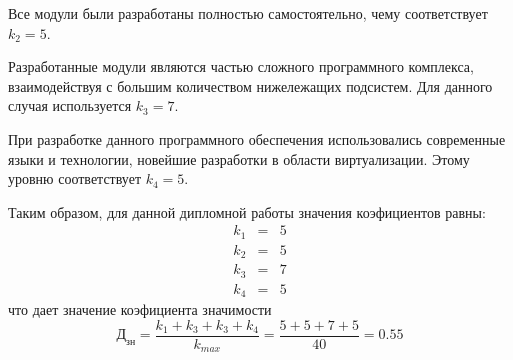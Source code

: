 Все модули были разработаны полностью самостоятельно, чему соответствует $k_2 = 5$.

Разработанные модули являются частью сложного программного комплекса, взаимодействуя
с большим количеством нижележащих подсистем. Для данного случая используется $k_3 = 7$.

При разработке данного программного обеспечения использовались современные языки и 
технологии, новейшие разработки в области виртуализации. Этому уровню соответствует $k_4 = 5$.

Таким образом, для данной дипломной работы значения коэфициентов равны:
\begin{eqnarray}
    k_1 &=& 5\nonumber \\
    k_2 &=& 5\nonumber \\
    k_3 &=& 7\nonumber \\
    k_4 &=& 5\nonumber 
\end{eqnarray}
что дает значение коэфициента значимости
\begin{equation}
  Д_{зн} = \frac{k_1 + k_3 + k_3 + k_4}{k_{max}} = \frac{5 + 5 + 7 + 5}{40} = 0.55
\end{equation}
